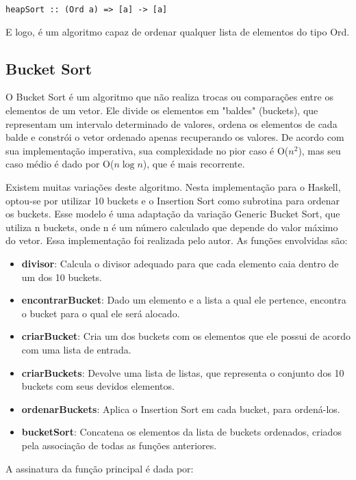 \documentclass[12pt,a4paper]{article}
\begin{document}
\begin{lstlisting}
heapSort :: (Ord a) => [a] -> [a]
\end{lstlisting}

E logo, é um algoritmo capaz de ordenar qualquer lista de elementos do tipo Ord.


\subsection{Bucket Sort}
O Bucket Sort é um algoritmo que não realiza trocas ou comparações entre os elementos de um vetor. Ele divide os elementos em "baldes"  (buckets), que representam um intervalo determinado de valores, ordena os elementos de cada balde e constrói o vetor ordenado apenas recuperando os valores. De acordo com sua implementação imperativa, sua complexidade no pior caso é O($n^2$), mas seu caso médio é dado por O($n \log n$), que é mais recorrente.

Existem muitas variações deste algoritmo. Nesta implementação para o Haskell, optou-se por utilizar 10 buckets e o Insertion Sort como subrotina para ordenar os buckets. Esse modelo é uma adaptação da variação Generic Bucket Sort, que utiliza n buckets, onde n é um número calculado que depende do valor máximo do vetor. Essa implementação foi realizada pelo autor. As funções envolvidas são:

\begin{itemize}
\item \textbf{divisor}: Calcula o divisor adequado para que cada elemento caia dentro de um dos 10 buckets.
\item \textbf{encontrarBucket}: Dado um elemento e a lista a qual ele pertence, encontra o bucket para o qual ele será alocado.
\item \textbf{criarBucket}: Cria um dos buckets com os elementos que ele possui de acordo com uma lista de entrada.
\item \textbf{criarBuckets}: Devolve uma lista de listas, que representa o conjunto dos 10 buckets com seus devidos elementos.
\item \textbf{ordenarBuckets}: Aplica o Insertion Sort em cada bucket, para ordená-los.
\item \textbf{bucketSort}: Concatena os elementos da lista de buckets ordenados, criados pela associação de todas as funções anteriores.
\end{itemize}

A assinatura da função principal é dada por:
\end{document}
